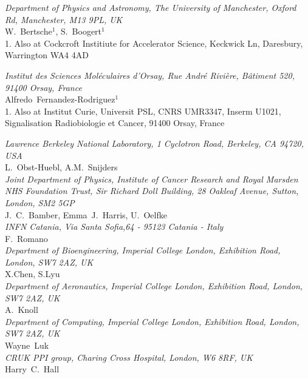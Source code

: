 \noindent \textit{Department of Physics and Astronomy, The University of Manchester, Oxford Rd, Manchester, M13 9PL, UK} \\
W.~Bertsche$^{1}$, S.~Boogert$^{1}$ \\
{\footnotesize
  1. Also at Cockcroft Institiute for Accelerator Science, Keckwick Ln, Daresbury, Warrington WA4 4AD \\
}
 
\noindent \textit{Institut des Sciences Moléculaires d'Orsay, Rue André Rivière, Bâtiment 520, 91400 Orsay, France} \\
Alfredo~Fernandez-Rodriguez$^{1}$ \\
{\footnotesize
  1. Also at Institut Curie, Universit PSL, CNRS UMR3347, Inserm U1021, Signalisation Radiobiologie et Cancer, 91400 Orsay, France \\
}
 
\noindent \textit{Lawrence Berkeley National Laboratory, 1 Cyclotron Road, Berkeley, CA 94720, USA} \\
L.~Obst-Huebl, A.M.~Snijders \\
 
\noindent \textit{Joint Department of Physics, Institute of Cancer Research and Royal Marsden NHS Foundation Trust, Sir Richard Doll Building, 28 Oakleaf Avenue, Sutton, London, SM2 5GP} \\
J.~C.~Bamber, Emma~J.~Harris, U.~Oelfke \\
 
\noindent \textit{INFN Catania, Via Santa Sofia,64 - 95123 Catania - Italy} \\
F.~Romano \\
 
\noindent \textit{Department of Bioengineering, Imperial College London, Exhibition Road, London, SW7 2AZ, UK} \\
X.Chen, S.Lyu \\
 
\noindent \textit{Department of Aeronautics, Imperial College London, Exhibition Road, London, SW7 2AZ, UK} \\
A.~Knoll \\
 
\noindent \textit{Department of Computing, Imperial College London, Exhibition Road, London, SW7 2AZ, UK} \\
Wayne~Luk \\
 
\noindent \textit{CRUK PPI group, Charing Cross Hospital, London, W6 8RF, UK} \\
Harry~C.~Hall \\
 
